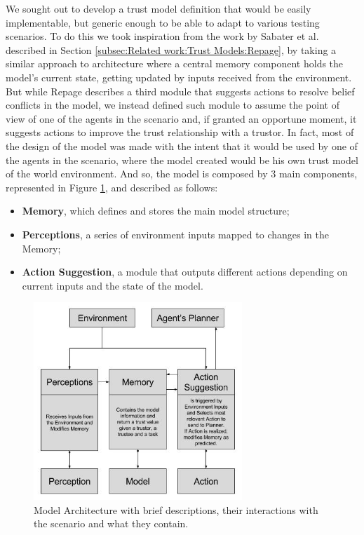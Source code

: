\label{chap:TrustModel}

We sought out to develop a trust model definition that would be easily implementable, but generic enough to be able to adapt to various testing scenarios. To do this we took inspiration from the work by Sabater et al. \cite{Sabater2006} described in Section \ref{subsec:Related work:Trust Models:Repage}, by taking a similar approach to architecture where a central memory component holds the model's current state, getting updated by inputs received from the environment. But while Repage describes a third module that suggests actions to resolve belief conflicts in the model, we instead defined such module to assume the point of view of one of the agents in the scenario and, if granted an opportune moment, it suggests actions to improve the trust relationship with a trustor. In fact, most of the design of the model was made with the intent that it would be used by one of the agents in the scenario, where the model created would be his own trust model of the world environment. And so, the model is composed by 3 main components, represented in Figure \ref{fig:ModelArchitecture}, and described as follows:
\begin{itemize}
    \item \textbf{Memory}, which defines and stores the main model structure;
    \item \textbf{Perceptions}, a series of environment inputs mapped to changes in the Memory;
    \item \textbf{Action Suggestion}, a module that outputs different actions depending on current inputs and the state of the model.
\end{itemize}

\begin{figure}[hbt]
    \centering
    \includegraphics[width=0.7\textwidth]{figures/ModelDiagram.jpg}
    \caption{Model Architecture with brief descriptions, their interactions with the scenario and what they contain.}
    \label{fig:ModelArchitecture}
\end{figure}


